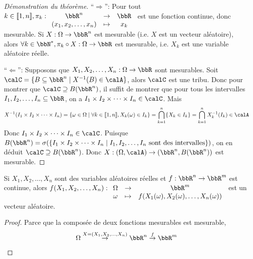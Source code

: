 \begin{proof}[Démonstration du théorème]
    ``$\Rightarrow$'':
    Pour tout $k \in \llb 1, n \rrb, \pi_k:
        \begin{array}[t]{ccc}
            \bbR^n                  & \to & \bbR \\
            (x_1, x_2, \ldots, x_n) & \tp & x_k
        \end{array}
    $ est une fonction continue, donc mesurable.
    Si $X: \Omega \to \bbR^n$ est mesurable (i.e. $X$ est un vecteur aléatoire),
    alors $\forall k \in \bbN^*, \pi_k \circ X: \Omega \to \bbR$ est mesurable,
    i.e. $X_k$ est une variable aléatoire réelle.

    ``$\Leftarrow$'':
    Supposons que $X_1, X_2, \ldots, X_n: \Omega \to \bbR$ sont mesurables.
    Soit $\calC = \{ B \subseteq \bbR^n \mid X^{-1}(B) \in \calA \}$,
    alors $\calC$ est une tribu.
    Donc pour montrer que $\calC \supseteq B(\bbR^n)$,
    il suffit de montrer que pour tous les intervalles $I_1, I_2, \ldots, I_n \subseteq \bbR$,
    on a $I_1 \times I_2 \times \cdots \times I_n \in \calC$.
    Mais \[ X^{-1}(I_1 \times I_2 \times \cdots \times I_n)
        = \{ \omega \in \Omega \mid \forall k \in \llb 1, n \rrb, X_k(\omega) \in I_k \}
        = \bigcap\limits_{k = 1}^n \{ X_k \in I_k \}
        = \bigcap\limits_{k = 1}^n X_k^{-1}(I_k) \in \calA \]
    Donc $I_1 \times I_2 \times \cdots \times I_n \in \calC$.
    Puisque $B(\bbR^n) = \sigma(\{ I_1 \times I_2 \times \cdots \times I_n \mid
        I_1, I_2, \ldots, I_n \text{ sont des intervalles} \})$,
    on en déduit $\calC \supseteq B(\bbR^n)$.
    Donc $X: (\Omega, \calA) \to (\bbR^n, B(\bbR^n))$ est mesurable. \qedhere
\end{proof}

\begin{cor}
    Si $X_1, X_2, \ldots, X_n$ sont des variables aléatoires réelles et $f: \bbR^n \to \bbR^m$ est continue,
    alors $f(X_1, X_2, \ldots, X_n):
        \begin{array}[t]{ccc}
            \Omega & \to & \bbR^m                                           \\
            \omega & \tp & f(X_1(\omega), X_2(\omega), \ldots, X_n(\omega))
        \end{array}
    $ est un vecteur aléatoire.
\end{cor}

\begin{proof}
    Parce que la composée de deux fonctions mesurables est mesurable,
    \[ \Omega \overset{X = (X_1, X_2, \ldots, X_n)}{\to} \bbR^n \overset{f}{\to} \bbR^m \qedhere \]
\end{proof}

